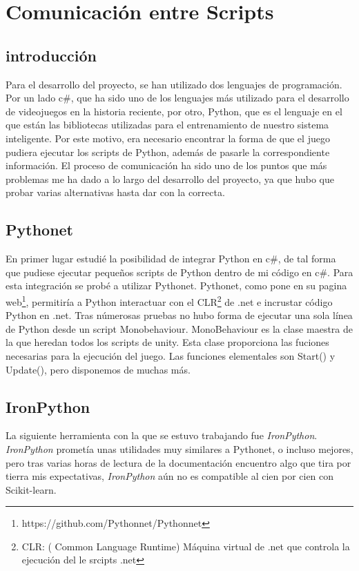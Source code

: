 \section{Comunicación entre Scripts}

\subsection{introducción}
Para el desarrollo del proyecto, se han utilizado dos lenguajes de programación. Por un lado c\#, que ha sido uno de los lenguajes más utilizado para el desarrollo de videojuegos en la historia reciente, por otro, Python, que es el lenguaje en el que están las bibliotecas utilizadas para el entrenamiento de nuestro sistema inteligente. Por este motivo, era necesario encontrar la forma de que el juego pudiera ejecutar los scripts de Python, además de pasarle la correspondiente información. El proceso de comunicación ha sido uno de los puntos que más problemas me ha dado a lo largo del desarrollo del proyecto, ya que hubo que probar varias alternativas hasta dar con la correcta.

\subsection{Pythonet}
En primer lugar estudié la posibilidad de integrar Python en c\#, de tal forma que pudiese ejecutar pequeños scripts de Python dentro de mi código en c\#. Para esta integración se probé a utilizar Pythonet. Pythonet, como pone en su pagina web\footnote{https://github.com/Pythonnet/Pythonnet}, permitiría a Python interactuar con el CLR\footnote{CLR: ( Common Language Runtime) Máquina virtual de .net que controla la ejecución del le srcipts .net} de .net e incrustar código Python en .net. Tras númerosas pruebas no hubo forma de ejecutar una sola línea de Python desde un script Monobehaviour. MonoBehaviour es la clase maestra de la que heredan todos los scripts de unity. Esta clase proporciona las fuciones necesarias para la ejecución del juego. Las funciones elementales son Start() y Update(), pero disponemos de muchas más. 


\subsection{IronPython}
La siguiente herramienta con la que se estuvo trabajando fue \emph{IronPython}. \emph{IronPython} prometía unas utilidades muy similares a Pythonet, o incluso mejores, pero tras varias horas de lectura de la documentación encuentro algo que tira por tierra mis expectativas, \emph{IronPython} aún no es compatible al cien por cien con Scikit-learn.

